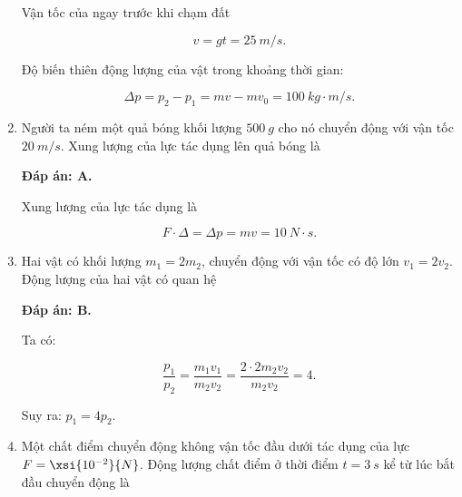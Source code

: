 \begin{enumerate}[label=\bfseries Câu \arabic*:]
{		Vận tốc của ngay trước khi chạm đất
		
		$$v =gt = \SI{25}{m/s}.$$
		
		Độ biến thiên động lượng của vật trong khoảng thời gian:
		
		$$\Delta p = p_2 - p_1 = mv -mv_0 = \SI{100}{kg \cdot m/s}.$$
		
	}
	\item {}
	
	
	{Người ta ném một quả bóng khối lượng $\SI{500}{g}$ cho nó chuyển động với vận tốc $\SI{20}{m/s}$. Xung lượng của lực tác dụng lên quả bóng là
	}
	
	\hideall
	{	
		\textbf{Đáp án: A.}
		
		Xung lượng của lực tác dụng là
		
		$$F \cdot \Delta = \Delta p = mv = \SI{10}{N\cdot s}.$$
	}
	\item {}
	
	
	{Hai vật có khối lượng $m_1 = 2m_2$, chuyển động với vận tốc có độ lớn $v_1 = 2v_2$. Động lượng của hai vật có quan hệ
	}
	
	\hideall
	{	
		\textbf{Đáp án: B.}
		
		Ta có:
		
		$$\dfrac{p_1}{p_2} = \dfrac{m_1v_1}{m_2v_2} = \dfrac{2 \cdot 2 m_2v_2}{m_2v_2} = 4.$$
		
		Suy ra: $p_1 = 4p_2.$
	}
	\item {}
	
	
	{Một chất điểm chuyển động không vận tốc đầu dưới tác dụng của lực $F = \xsi{10^{-2}}{N}$. Động lượng chất điểm ở thời điểm $t = \SI{3}{s}$ kể từ lúc bắt đầu chuyển động là 
	}
	

\end{enumerate}
